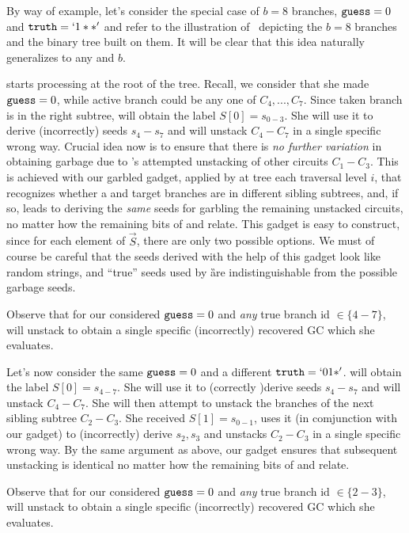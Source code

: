 By way of example, let's consider the special case of $b=8$ branches,  $\mathtt{guess}=0$ and $\mathtt{truth} = `1**'$ and refer to the illustration of~ depicting the $b=8$ branches and the binary tree built on them.  It will be clear that this idea naturally generalizes to any \guess and $b$.  

\E starts processing at the root of the tree.  Recall, we consider that she made $\mathtt{guess} = 0$, while active branch could be any one of $C_4,..., C_7$.  
Since taken branch is in the right subtree, 
 \E will obtain the label $S[0]=s_{0-3}$.  She will use it to derive (incorrectly) seeds $s_4-s_7$ and will unstack $C_4-C_7$ in a single specific wrong way.   Crucial idea now is to ensure that there is {\em no further variation} in \E obtaining garbage due to \E's attempted unstacking of other circuits $C_1-C_3$.  This is achieved with our garbled gadget, applied by \E at tree each traversal level $i$, that recognizes whether a \guess and target branches are in different sibling subtrees, and, if so, leads \E to deriving the {\em same} seeds for garbling the remaining unstacked circuits, no matter how the remaining bits of \truth and \guess relate.  This gadget is easy to construct, since for each element of $\vec S$, there are only two possible options.  We must of course be careful  that the seeds derived with the help of this gadget look like random strings, and ``true'' seeds used by \G are indistinguishable from the possible garbage seeds.

Observe that for our considered $\mathtt{guess}=0$ and {\em any} true branch id $\in \{4-7\}$, \E will unstack to obtain a single specific (incorrectly) recovered GC which she evaluates.

Let's now consider the same $\mathtt{guess}=0$ and a different $\mathtt{truth} = `01*'$.  \E will obtain the label $S[0]=s_{4-7}$.  She will use it to (correctly )derive seeds $s_4-s_7$ and will unstack $C_4-C_7$.  She will then attempt to unstack the branches of the next sibling subtree $C_2-C_3$.  She received  $S[1] = s_{0-1}$, uses it (in comjunction with our gadget) to (incorrectly) derive $s_2,s_3$ and unstacks $C_2-C_3$ in a single specific wrong way. By the same argument as above, our gadget ensures that subsequent unstacking is identical  no matter how the remaining bits of \truth and \guess relate.

Observe that for our considered $\mathtt{guess}=0$ and {\em any} true branch id $\in \{2-3\}$, \E will unstack to obtain a single specific (incorrectly) recovered GC which she evaluates.

